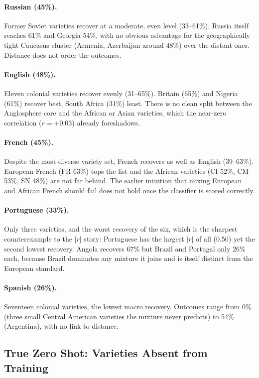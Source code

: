 \documentclass[11pt]{article}
\begin{document}
\paragraph{Russian (45\%).}
Former Soviet varieties recover at a moderate, even level (33--61\%).
Russia itself reaches 61\% and Georgia 54\%, with no obvious advantage for the geographically tight Caucasus cluster (Armenia, Azerbaijan around 48\%) over the distant ones.
Distance does not order the outcomes.

\paragraph{English (48\%).}
Eleven colonial varieties recover evenly (31--65\%).
Britain (65\%) and Nigeria (61\%) recover best, South Africa (31\%) least.
There is no clean split between the Anglosphere core and the African or Asian varieties, which the near-zero correlation ($r{=}{+}0.03$) already foreshadows.

\paragraph{French (45\%).}
Despite the most diverse variety set, French recovers as well as English (39--63\%).
European French (FR 63\%) tops the list and the African varieties (CI 52\%, CM 53\%, SN 48\%) are not far behind.
The earlier intuition that mixing European and African French should fail does not hold once the classifier is scored correctly.

\paragraph{Portuguese (33\%).}
Only three varieties, and the worst recovery of the six, which is the sharpest counterexample to the $|r|$ story: Portuguese has the largest $|r|$ of all (0.50) yet the second lowest recovery.
Angola recovers 67\% but Brazil and Portugal only 26\% each, because Brazil dominates any mixture it joins and is itself distinct from the European standard.

\paragraph{Spanish (26\%).}
Seventeen colonial varieties, the lowest macro recovery.
Outcomes range from 0\% (three small Central American varieties the mixture never predicts) to 54\% (Argentina), with no link to distance.

\subsection{True Zero Shot: Varieties Absent from Training}
\end{document}
